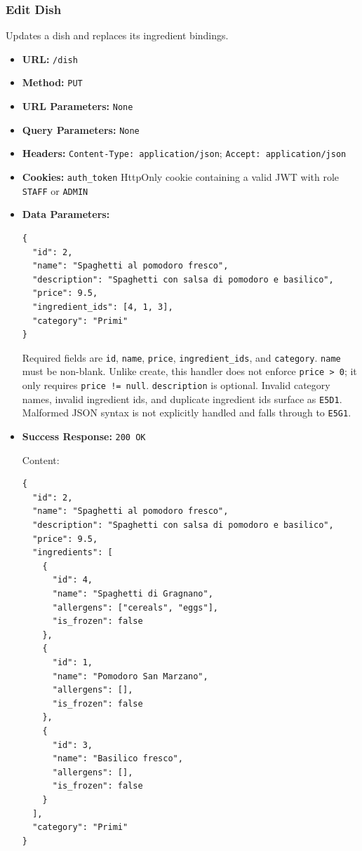 \subsubsection*{Edit Dish}

Updates a dish and replaces its ingredient bindings.

\begin{itemize}[nosep]
\item \textbf{URL:} \texttt{/dish}

\item \textbf{Method:} \texttt{PUT}

\item \textbf{URL Parameters:} \texttt{None}

\item \textbf{Query Parameters:} \texttt{None}

\item \textbf{Headers:} \texttt{Content-Type: application/json}; \texttt{Accept: application/json}

\item \textbf{Cookies:} \texttt{auth\_token} HttpOnly cookie containing a valid JWT with role \texttt{STAFF} or \texttt{ADMIN}

\item \textbf{Data Parameters:}

\begin{lstlisting}
{
  "id": 2,
  "name": "Spaghetti al pomodoro fresco",
  "description": "Spaghetti con salsa di pomodoro e basilico",
  "price": 9.5,
  "ingredient_ids": [4, 1, 3],
  "category": "Primi"
}
\end{lstlisting}

Required fields are \texttt{id}, \texttt{name}, \texttt{price}, \texttt{ingredient\_ids}, and \texttt{category}. \texttt{name} must be non-blank. Unlike create, this handler does not enforce \texttt{price > 0}; it only requires \texttt{price != null}. \texttt{description} is optional. Invalid category names, invalid ingredient ids, and duplicate ingredient ids surface as \texttt{E5D1}. Malformed JSON syntax is not explicitly handled and falls through to \texttt{E5G1}.

\item \textbf{Success Response:} \texttt{200 OK}

Content:

\begin{lstlisting}
{
  "id": 2,
  "name": "Spaghetti al pomodoro fresco",
  "description": "Spaghetti con salsa di pomodoro e basilico",
  "price": 9.5,
  "ingredients": [
    {
      "id": 4,
      "name": "Spaghetti di Gragnano",
      "allergens": ["cereals", "eggs"],
      "is_frozen": false
    },
    {
      "id": 1,
      "name": "Pomodoro San Marzano",
      "allergens": [],
      "is_frozen": false
    },
    {
      "id": 3,
      "name": "Basilico fresco",
      "allergens": [],
      "is_frozen": false
    }
  ],
  "category": "Primi"
}
\end{lstlisting}


\end{itemize}
